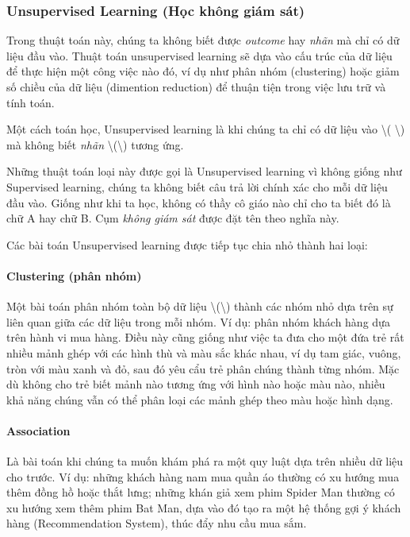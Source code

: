 \subsubsection{Unsupervised Learning (Học không giám
sát)}\label{unsupervised-learning-hux1ecdc-khuxf4ng-giuxe1m-suxe1t}

Trong thuật toán này, chúng ta không biết được \emph{outcome} hay
\emph{nhãn} mà chỉ có dữ liệu đầu vào. Thuật toán unsupervised learning
sẽ dựa vào cấu trúc của dữ liệu để thực hiện một công việc nào đó, ví dụ
như phân nhóm (clustering) hoặc giảm số chiều của dữ liệu (dimention
reduction) để thuận tiện trong việc lưu trữ và tính toán.

Một cách toán học, Unsupervised learning là khi chúng ta chỉ có dữ liệu
vào \textbackslash{}( \textbackslash{}) mà không biết
\emph{nhãn} \textbackslash{}(\textbackslash{}) tương ứng.

Những thuật toán loại này được gọi là Unsupervised learning vì không
giống như Supervised learning, chúng ta không biết câu trả lời chính xác
cho mỗi dữ liệu đầu vào. Giống như khi ta học, không có thầy cô giáo nào
chỉ cho ta biết đó là chữ A hay chữ B. Cụm \emph{không giám sát} được
đặt tên theo nghĩa này.

Các bài toán Unsupervised learning được tiếp tục chia nhỏ thành hai
loại:

\paragraph{Clustering (phân nhóm)}\label{clustering-phuxe2n-nhuxf3m}

Một bài toán phân nhóm toàn bộ dữ liệu
\textbackslash{}(\textbackslash{}) thành các nhóm nhỏ dựa
trên sự liên quan giữa các dữ liệu trong mỗi nhóm. Ví dụ: phân nhóm
khách hàng dựa trên hành vi mua hàng. Điều này cũng giống như việc ta
đưa cho một đứa trẻ rất nhiều mảnh ghép với các hình thù và màu sắc khác
nhau, ví dụ tam giác, vuông, tròn với màu xanh và đỏ, sau đó yêu cẩu trẻ
phân chúng thành từng nhóm. Mặc dù không cho trẻ biết mảnh nào tương ứng
với hình nào hoặc màu nào, nhiều khả năng chúng vẫn có thể phân loại các
mảnh ghép theo màu hoặc hình dạng.

\hypertarget{association}{\paragraph{Association}\label{association}}

Là bài toán khi chúng ta muốn khám phá ra một quy luật dựa trên nhiều dữ
liệu cho trước. Ví dụ: những khách hàng nam mua quần áo thường có xu
hướng mua thêm đồng hồ hoặc thắt lưng; những khán giả xem phim Spider
Man thường có xu hướng xem thêm phim Bat Man, dựa vào đó tạo ra một hệ
thống gợi ý khách hàng (Recommendation System), thúc đẩy nhu cầu mua
sắm.

